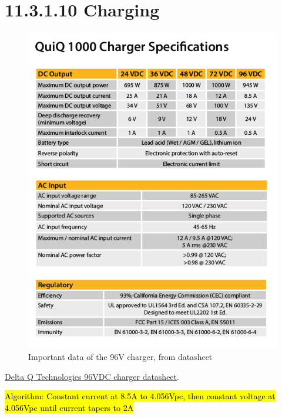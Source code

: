 \documentclass{article}
\DeclareRobustCommand{\hlr}[1]{{\sethlcolor{red}\hl{#1}}}
\begin{document}
\section*{11.3.1.10 Charging}

\begin{figure}[H]
    \centering
    \includegraphics[width = 0.8 \textwidth]{chargerdata}
    \caption{Important data of the 96V charger, from datasheet}
    \label{chargerdatasheet}
\end{figure}

\href{http://delta-q.com/wp-content/uploads/2015/12/Delta-Q_QuiQ1000_BatteryCharger_Specifications.pdf}{Delta Q Technologies 96VDC charger datasheet}.

\hlr{Algorithm: Constant current at 8.5A to 4.056Vpc, then constant voltage at 4.056Vpc until current tapers to 2A}
\end{document}
